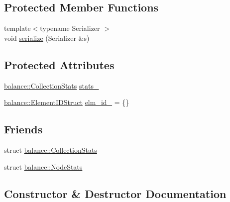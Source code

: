 \subsection*{Protected Member Functions}
\begin{DoxyCompactItemize}
\item 
{\footnotesize template$<$typename Serializer $>$ }\\void \hyperlink{structvt_1_1vrt_1_1collection_1_1_migratable_a2ff02da700394ecd37f3fbb6f0724a3e}{serialize} (Serializer \&s)
\end{DoxyCompactItemize}
\subsection*{Protected Attributes}
\begin{DoxyCompactItemize}
\item 
\hyperlink{structvt_1_1vrt_1_1collection_1_1balance_1_1_collection_stats}{balance\+::\+Collection\+Stats} \hyperlink{structvt_1_1vrt_1_1collection_1_1_migratable_a7c817ccfcec8fab757528c4d639445e0}{stats\+\_\+}
\item 
\hyperlink{namespacevt_1_1vrt_1_1collection_1_1balance_a9f5b53fafb270212279a4757d2c4cd28}{balance\+::\+Element\+I\+D\+Struct} \hyperlink{structvt_1_1vrt_1_1collection_1_1_migratable_aef4c21c94ff642a460c5686ec4944c51}{elm\+\_\+id\+\_\+} = \{\}
\end{DoxyCompactItemize}
\subsection*{Friends}
\begin{DoxyCompactItemize}
\item 
struct \hyperlink{structvt_1_1vrt_1_1collection_1_1_migratable_a63d397213f807c4b6bbdfe22259f0004}{balance\+::\+Collection\+Stats}
\item 
struct \hyperlink{structvt_1_1vrt_1_1collection_1_1_migratable_aeb7bfed9b6cf9f03ff3a2d6798de8dd0}{balance\+::\+Node\+Stats}
\end{DoxyCompactItemize}


\subsection{Constructor \& Destructor Documentation}
\mbox{\label{structvt_1_1vrt_1_1collection_1_1_migratable_a598f0bb3acfb602d437eab3625b105c5}} 
